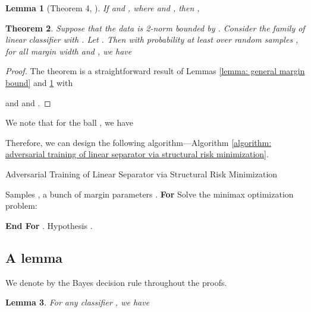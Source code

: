 \documentclass[11pt]{article}
\newtheorem{theorem}{Theorem}[section]
\newtheorem{lemma}[theorem]{Lemma}
\newcommand{\0}{\mathbf{0}}
\newcommand{\1}{\mathbf{1}}
\begin{document}
\begin{lemma}[Theorem 4, \cite{zhang2002covering}]
\label{lemma: covering number}
If  and , where  and , then ,

\end{lemma}

\begin{theorem}
Suppose that the data is 2-norm bounded by . Consider the family  of linear classifier  with . Let . Then with probability at least  over  random samples , for all margin width  and , we have

\end{theorem}

\begin{proof}
The theorem is a straightforward result of Lemmas \ref{lemma: general margin bound} and \ref{lemma: covering number} with


and  and .
\end{proof}

We note that for the  ball , we have

Therefore, we can design the following algorithm---Algorithm \ref{algorithm: adversarial training of linear separator via structural risk minimization}.

\begin{algorithm}[ht]
\caption{Adversarial Training of Linear Separator via Structural Risk Minimization}
\begin{algorithmic}
\label{algorithm: adversarial training of linear separator via structural risk minimization}
 Samples , a bunch of margin parameters .
 \textbf{For} 
 \quad Solve the minimax optimization problem:

 \textbf{End For}
 .
 Hypothesis .
\end{algorithmic}
\end{algorithm}



\subsection{A lemma}

We denote by  the Bayes decision rule throughout the proofs.

\begin{lemma}
\label{lemma: risk equality}
For any classifier , we have

\end{lemma}
\end{document}
